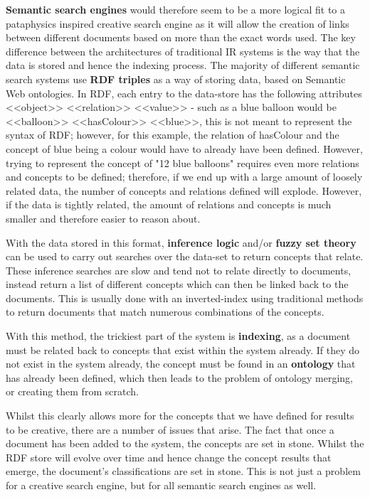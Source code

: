 \textbf{Semantic search engines} would therefore seem to be a more logical fit to a pataphysics inspired creative search engine as it will allow the creation of links between different documents based on more than the exact words used.
The key difference between the architectures of traditional IR systems is the way that the data is stored and hence the indexing process. The majority of different semantic search systems use \textbf{RDF triples} as a way of storing data, based on Semantic Web ontologies.  In RDF, each entry to the data-store has the following attributes <<object>> <<relation>> <<value>>  - such as a blue balloon would be  <<balloon>> <<hasColour>> <<blue>>, this is not meant to represent the syntax of RDF; however, for this example, the relation of hasColour and the concept of blue being a colour would have to already have been defined.  However, trying to represent the concept of "12 blue balloons" requires even more relations and concepts to be defined; therefore, if we end up with a large amount of loosely related data, the number of concepts and relations defined will explode. However, if the data is tightly related, the amount of relations and concepts is much smaller and therefore easier to reason about.

With the data stored in this format, \textbf{inference logic} and/or \textbf{fuzzy set theory} can be used to carry out searches over the data-set to return concepts that relate. These inference searches are slow and tend not to relate directly to documents, instead return a list of different concepts which can then be linked back to the documents. This is usually done with an inverted-index using traditional methods to return documents that match numerous combinations of the concepts.

With this method, the trickiest part of the system is \textbf{indexing}, as a document must be related back to concepts that exist within the system already. If they do not exist in the system already, the concept must be found in an \textbf{ontology} that has already been defined, which then leads to the problem of ontology merging, or creating them from scratch.

Whilst this clearly allows more for the concepts that we have defined for results to be creative, there are a number of issues that arise. The fact that once a document has been added to the system, the concepts are set in stone. Whilst the RDF store will evolve over time and hence change the concept results that emerge, the document's classifications are set in stone. This is not just a problem for a creative search engine, but for all semantic search engines as well.

